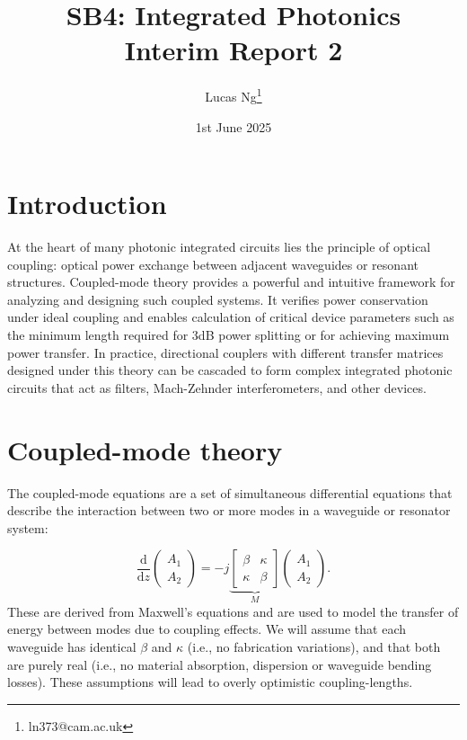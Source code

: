 \documentclass[10pt, a4paper]{article}
\title{\Large \bfseries SB4: Integrated Photonics\\[0.5em] \large Interim Report 2}
\author{Lucas Ng\thanks{ln373@cam.ac.uk}}
\date{1st June 2025}
\begin{document}
\maketitle

\section{Introduction}
At the heart of many photonic integrated circuits lies the principle of optical coupling: optical power exchange between adjacent waveguides or resonant structures. Coupled-mode theory provides a powerful and intuitive framework for analyzing and designing such coupled systems. It verifies power conservation under ideal coupling and enables calculation of critical device parameters such as the minimum length required for 3dB power splitting or for achieving maximum power transfer.
In practice, directional couplers with different transfer matrices designed under this theory can be cascaded to form complex integrated photonic circuits that act as filters,
Mach-Zehnder interferometers, and other devices\autocite{liMultimodeSiliconPhotonics2019}.

\section{Coupled-mode theory}
The coupled-mode equations are a set of simultaneous differential equations that describe the interaction between two or more modes in a waveguide or resonator system:

\begin{equation}
\frac{\mathrm{d}}{\mathrm{d}z}
\begin{pmatrix}
A_1\\
A_2
\end{pmatrix}
=
-j
\underbrace{
\begin{bmatrix}
\beta & \kappa \\
\kappa & \beta
\end{bmatrix}}_{M}
\begin{pmatrix}
A_1 \\
A_2
\end{pmatrix}.
\end{equation}
These are derived from Maxwell's equations and are used to model the transfer of energy between modes due to coupling effects.
We will assume that each waveguide has identical $\beta$ and $\kappa$ (i.e., no fabrication variations),
and that both are purely real (i.e., no material absorption, dispersion or waveguide bending losses).
These assumptions will lead to overly optimistic coupling-lengths.
\end{document}
